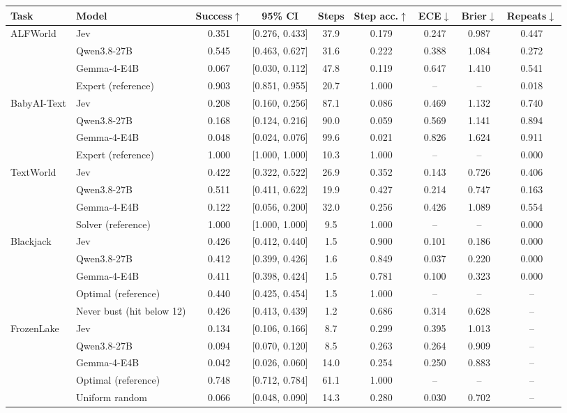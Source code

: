\begin{tabular}{l l c c c c c c c}
    \toprule
    Task & Model & Success$\uparrow$ & 95\% CI & Steps & Step acc.$\uparrow$ & ECE$\downarrow$ & Brier$\downarrow$ & Repeats$\downarrow$ \\
    \midrule
    ALFWorld & Jev & 0.351 & [0.276, 0.433] & 37.9 & 0.179 & 0.247 & 0.987 & 0.447 \\
    \rowcolor{gray!10} & Qwen3.8-27B & 0.545 & [0.463, 0.627] & 31.6 & 0.222 & 0.388 & 1.084 & 0.272 \\
     & Gemma-4-E4B & 0.067 & [0.030, 0.112] & 47.8 & 0.119 & 0.647 & 1.410 & 0.541 \\
    \rowcolor{gray!10} & Expert (reference) & 0.903 & [0.851, 0.955] & 20.7 & 1.000 & -- & -- & 0.018 \\
    \midrule
    BabyAI-Text & Jev & 0.208 & [0.160, 0.256] & 87.1 & 0.086 & 0.469 & 1.132 & 0.740 \\
    \rowcolor{gray!10} & Qwen3.8-27B & 0.168 & [0.124, 0.216] & 90.0 & 0.059 & 0.569 & 1.141 & 0.894 \\
    & Gemma-4-E4B & 0.048 & [0.024, 0.076] & 99.6 & 0.021 & 0.826 & 1.624 & 0.911 \\
    \rowcolor{gray!10} & Expert (reference) & 1.000 & [1.000, 1.000] & 10.3 & 1.000 & -- & -- & 0.000 \\
    \midrule
    TextWorld & Jev & 0.422 & [0.322, 0.522] & 26.9 & 0.352 & 0.143 & 0.726 & 0.406 \\
    \rowcolor{gray!10} & Qwen3.8-27B & 0.511 & [0.411, 0.622] & 19.9 & 0.427 & 0.214 & 0.747 & 0.163 \\
    & Gemma-4-E4B & 0.122 & [0.056, 0.200] & 32.0 & 0.256 & 0.426 & 1.089 & 0.554 \\
    \rowcolor{gray!10} & Solver (reference) & 1.000 & [1.000, 1.000] & 9.5 & 1.000 & -- & -- & 0.000 \\
    \midrule
    Blackjack & Jev & 0.426 & [0.412, 0.440] & 1.5 & 0.900 & 0.101 & 0.186 & 0.000 \\
    \rowcolor{gray!10} & Qwen3.8-27B & 0.412 & [0.399, 0.426] & 1.6 & 0.849 & 0.037 & 0.220 & 0.000 \\
     & Gemma-4-E4B & 0.411 & [0.398, 0.424] & 1.5 & 0.781 & 0.100 & 0.323 & 0.000 \\
    \rowcolor{gray!10} & Optimal (reference) & 0.440 & [0.425, 0.454] & 1.5 & 1.000 & -- & -- & -- \\
     & Never bust (hit below 12) & 0.426 & [0.413, 0.439] & 1.2 & 0.686 & 0.314 & 0.628 & -- \\
    \midrule
    \rowcolor{gray!10}FrozenLake & Jev & 0.134 & [0.106, 0.166] & 8.7 & 0.299 & 0.395 & 1.013 & -- \\
     & Qwen3.8-27B & 0.094 & [0.070, 0.120] & 8.5 & 0.263 & 0.264 & 0.909 & -- \\
    \rowcolor{gray!10} & Gemma-4-E4B & 0.042 & [0.026, 0.060] & 14.0 & 0.254 & 0.250 & 0.883 & -- \\
     & Optimal (reference) & 0.748 & [0.712, 0.784] & 61.1 & 1.000 & -- & -- & -- \\
    \rowcolor{gray!10} & Uniform random & 0.066 & [0.048, 0.090] & 14.3 & 0.280 & 0.030 & 0.702 & -- \\
    \bottomrule
\end{tabular}
